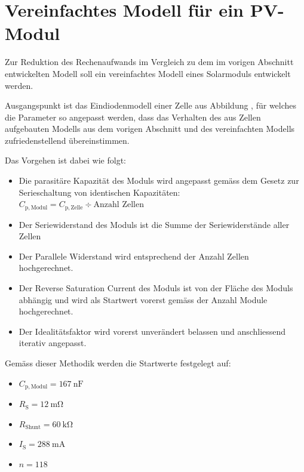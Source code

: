 \chapter{Vereinfachtes Modell f\"ur ein PV-Modul}
\label{app:models:develop:module:simple}

Zur  Reduktion des  Rechenaufwands im  Vergleich zu  dem im  vorigen Abschnitt
entwickelten Modell soll ein vereinfachtes Modell eines Solarmoduls entwickelt
werden.

Ausgangspunkt   ist   das   Eindiodenmodell    einer   Zelle   aus   Abbildung
, f\"ur  welches die Parameter  so angepasst werden,  dass das
Verhalten des aus Zellen aufgebauten Modells aus dem vorigen Abschnitt und des
vereinfachten Modells zufriedenstellend \"ubereinstimmen.

Das Vorgehen ist dabei wie folgt: 

\begin{itemize}
    \firmlist
    \item
        Die parasit\"are  Kapazit\"at des  Moduls wird angepasst  gem\"ass dem
        Gesetz zur Serieschaltung von identischen Kapazit\"aten:
        $C_{\mathrm{p, Modul}} = C_{\mathrm{p, Zelle}} \div \text{Anzahl Zellen}$
    \item
        Der Seriewiderstand des Moduls ist die Summe der Seriewiderst\"ande aller
        Zellen
    \item
        Der  Parallele   Widerstand  wird   entsprechend  der   Anzahl  Zellen
        hochgerechnet.
    \item
        Der Reverse  Saturation Current  des Moduls ist  von der  Fl\"ache des
        Moduls abh\"angig und  wird als Startwert vorerst  gem\"ass der Anzahl
        Module hochgerechnet.
    \item
        Der  Idealit\"atsfaktor   wird  vorerst  unver\"andert   belassen  und
        anschliessend iterativ angepasst.
\end{itemize}

Gem\"ass dieser Methodik werden die Startwerte festgelegt auf:

\begin{itemize}
    \firmlist
    \item
        $C_{\mathrm{p, Modul}} = \SI{167}{\nano\farad}$
    \item
        $R_{\mathrm{S}} = \SI{12}{\milli\ohm}$
    \item
        $R_{\mathrm{Shunt}} = \SI{60}{\kilo\ohm}$
    \item
        $I_{\mathrm{S}} = \SI{288}{\milli\ampere}$
    \item
        $n = 118$
\end{itemize}

